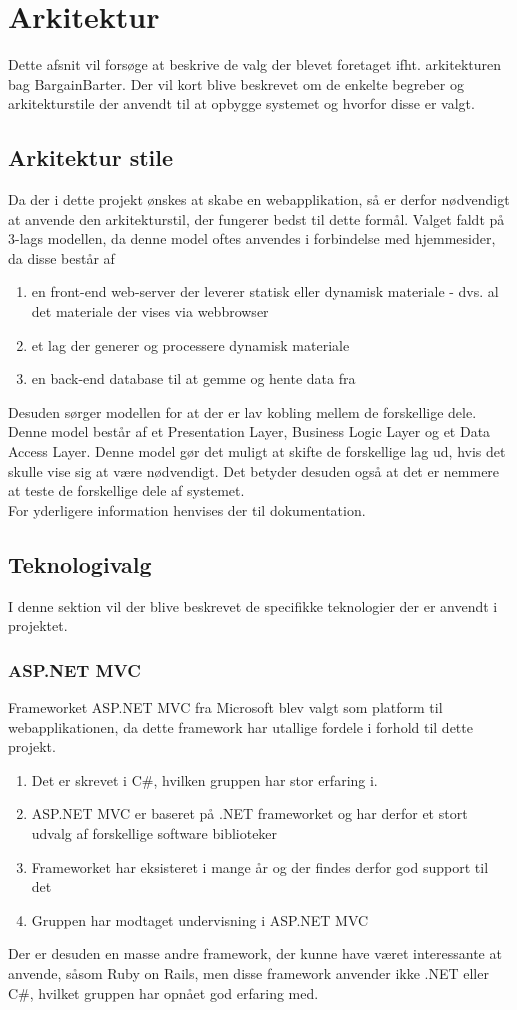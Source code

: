 \chapter{Arkitektur}
Dette afsnit vil forsøge at beskrive de valg der blevet foretaget ifht. arkitekturen bag BargainBarter. Der vil kort blive beskrevet om de enkelte begreber og arkitekturstile der anvendt til at opbygge systemet og hvorfor disse er valgt.

\section{Arkitektur stile}
Da der i dette projekt ønskes at skabe en webapplikation, så er derfor nødvendigt at anvende den arkitekturstil, der fungerer bedst til dette formål. 
Valget faldt på 3-lags modellen, da denne model oftes anvendes i forbindelse med hjemmesider, da disse består af
\begin{enumerate}
	\item en front-end web-server der leverer statisk eller dynamisk materiale - dvs. al det materiale der vises via webbrowser
	\item et lag der generer og processere  dynamisk materiale 
	\item en back-end database til at gemme og hente data fra
\end{enumerate}
Desuden sørger modellen for at der er lav kobling mellem de forskellige dele. Denne model består af et Presentation Layer, Business Logic Layer og et Data Access Layer. Denne model gør det muligt at skifte de forskellige lag ud, hvis det skulle vise sig at være nødvendigt. Det betyder desuden også at det er nemmere at teste de forskellige dele af systemet. \\
For yderligere information henvises der til dokumentation.

\section{Teknologivalg}
I denne sektion vil der blive beskrevet de specifikke teknologier der er anvendt i projektet.

\subsection{ASP.NET MVC}
Frameworket ASP.NET MVC fra Microsoft blev valgt som platform til webapplikationen, da dette framework har utallige fordele i forhold til dette projekt. 
\begin{enumerate}
	\item Det er skrevet i C\#, hvilken gruppen har stor erfaring i.
	\item ASP.NET MVC er baseret på .NET frameworket og har derfor et stort udvalg af forskellige software biblioteker 
	\item Frameworket har eksisteret i mange år og der findes derfor god support til det
	\item Gruppen har modtaget undervisning i ASP.NET MVC
\end{enumerate}
Der er desuden en masse andre framework, der kunne have været interessante at anvende, såsom Ruby on Rails, men disse framework anvender ikke .NET eller C\#, hvilket gruppen har opnået god erfaring med.

